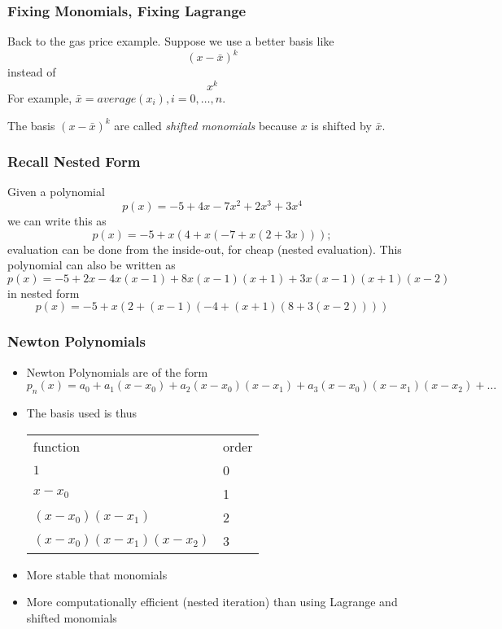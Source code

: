 \documentclass[10pt]{beamer}
\begin{document}
\begin{frame}
\frametitle{Fixing Monomials, Fixing Lagrange}
Back to the gas price example.  Suppose we use a better basis like
\begin{equation*}
  (x-\bar{x})^k
\end{equation*}
instead of
\begin{equation*}
  x^k
\end{equation*}
For example, $\bar{x} = average(x_i), i=0,\dots,n$.

The basis $(x-\bar{x})^k$ are called \emph{shifted monomials} because
$x$ is shifted by $\bar{x}$.
  
\end{frame}
\begin{frame}
\frametitle{Recall Nested Form}
Given a polynomial
\begin{equation*}
  p(x) = -5 + 4x -7x^2 + 2x^3 + 3x^4
\end{equation*}
we can write this as
\begin{equation*}
  p(x) = -5 + x(4 + x(-7 + x(2 + 3x)));
\end{equation*}
evaluation can be done from the inside-out, for cheap (nested
evaluation).  This polynomial can also be written as
\begin{equation*}
  p(x) = -5 + 2x - 4x(x-1) + 8x(x-1)(x+1) + 3x(x-1)(x+1)(x-2)
\end{equation*}
in nested form
\begin{equation*}
  p(x) = -5 + x(2 + (x-1)(-4 + (x+1)(8 + 3(x-2))))
\end{equation*}
\end{frame}
\begin{frame}
\frametitle{Newton Polynomials}
\begin{itemize}
\item Newton Polynomials are of the form
  \begin{equation*}
    p_n(x) = a_0 + a_1(x-x_0) + a_2(x-x_0)(x-x_1) + a_3(x-x_0)(x-x_1)(x-x_2) + \dots
  \end{equation*}

\item The basis used is thus
\begin{center}
  \begin{tabular}{l l}
  function & order \\
  $1$ & 0\\
  $x-x_0$ & 1\\
  $(x-x_0)(x-x_1)$ & 2\\
  $(x-x_0)(x-x_1)(x-x_2)$ & 3\\
  \end{tabular}
\end{center}

\item More stable that monomials
\item More computationally efficient (nested iteration) than using Lagrange
and shifted monomials
\end{itemize}
\end{frame}
\end{document}

